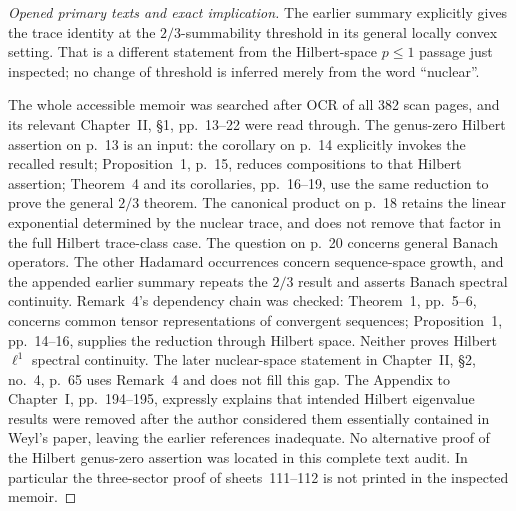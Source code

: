 \begin{proof}[Opened primary texts and exact implication]
The earlier summary \cite[Chapter II, no.~6, Theorem 8 and Corollary 2,
pp.~107--108]{Grothendieck1952Summary} explicitly gives the trace identity
at the $2/3$-summability threshold in its general locally convex setting.
That is a different statement from the Hilbert-space $p\leq1$ passage
just inspected; no change of threshold is inferred merely from the word
``nuclear''.

The whole accessible memoir was searched after OCR of all 382 scan pages,
and its relevant Chapter~II, \S1, pp.~13--22 were read through. The
genus-zero Hilbert assertion on p.~13 is an input: the corollary on p.~14
explicitly invokes the recalled result; Proposition~1, p.~15, reduces
compositions to that Hilbert assertion; Theorem~4 and its corollaries,
pp.~16--19, use the same reduction to prove the general $2/3$ theorem.
The canonical product on p.~18 retains the linear exponential determined
by the nuclear trace, and does not remove that factor in the full
Hilbert trace-class case. The question on p.~20 concerns general Banach
operators. The other Hadamard occurrences concern sequence-space growth,
and the appended earlier summary repeats the $2/3$ result and asserts
Banach spectral continuity. Remark~4's dependency chain was checked:
Theorem~1, pp.~5--6, concerns common tensor representations of convergent
sequences; Proposition~1, pp.~14--16, supplies the reduction through
Hilbert space. Neither proves Hilbert $\ell^1$ spectral continuity.
The later nuclear-space statement in Chapter~II, \S2, no.~4, p.~65
uses Remark~4 and does not fill this gap. The Appendix to Chapter~I,
pp.~194--195, expressly explains that intended Hilbert eigenvalue results
were removed after the author considered them essentially contained in
Weyl's paper, leaving the earlier references inadequate. No alternative
proof of the Hilbert genus-zero assertion was located in this complete
text audit. In particular the three-sector proof of sheets~111--112 is
not printed in the inspected memoir.


\end{proof}
